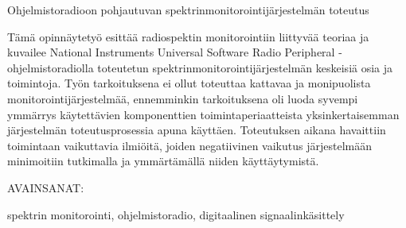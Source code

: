 \vspace{10mm}
{\huge Ohjelmistoradioon pohjautuvan spektrinmonitorointijärjestelmän toteutus \par}

\vspace{10mm}

Tämä opinnäytetyö esittää radiospektin monitorointiin liittyvää teoriaa
ja kuvailee National Instruments Universal Software Radio Peripheral -ohjelmistoradiolla
toteutetun spektrinmonitorointijärjestelmän keskeisiä osia ja toimintoja.
Työn tarkoituksena ei ollut toteuttaa kattavaa ja monipuolista monitorointijärjestelmää,
ennemminkin tarkoituksena oli luoda syvempi ymmärrys käytettävien komponenttien
toimintaperiaatteista yksinkertaisemman järjestelmän toteutusprosessia apuna käyttäen.
Toteutuksen aikana havaittiin toimintaan vaikuttavia ilmiöitä, joiden negatiivinen
vaikutus järjestelmään minimoitiin tutkimalla ja ymmärtämällä niiden käyttäytymistä.

\vspace{30mm}

AVAINSANAT:

spektrin monitorointi, ohjelmistoradio, digitaalinen signaalinkäsittely
